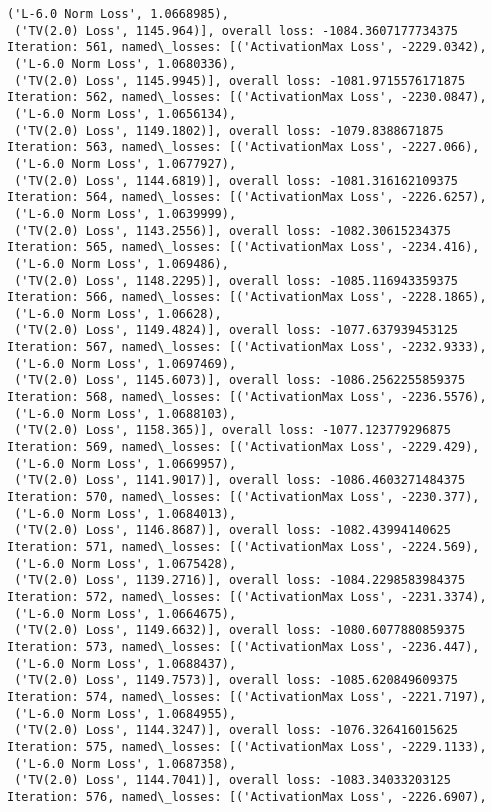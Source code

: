 \documentclass[10pt]{article}
\begin{document}
\begin{Verbatim}[commandchars=\\\{\}]
 ('L-6.0 Norm Loss', 1.0668985),
 ('TV(2.0) Loss', 1145.964)], overall loss: -1084.3607177734375
Iteration: 561, named\_losses: [('ActivationMax Loss', -2229.0342),
 ('L-6.0 Norm Loss', 1.0680336),
 ('TV(2.0) Loss', 1145.9945)], overall loss: -1081.9715576171875
Iteration: 562, named\_losses: [('ActivationMax Loss', -2230.0847),
 ('L-6.0 Norm Loss', 1.0656134),
 ('TV(2.0) Loss', 1149.1802)], overall loss: -1079.8388671875
Iteration: 563, named\_losses: [('ActivationMax Loss', -2227.066),
 ('L-6.0 Norm Loss', 1.0677927),
 ('TV(2.0) Loss', 1144.6819)], overall loss: -1081.316162109375
Iteration: 564, named\_losses: [('ActivationMax Loss', -2226.6257),
 ('L-6.0 Norm Loss', 1.0639999),
 ('TV(2.0) Loss', 1143.2556)], overall loss: -1082.30615234375
Iteration: 565, named\_losses: [('ActivationMax Loss', -2234.416),
 ('L-6.0 Norm Loss', 1.069486),
 ('TV(2.0) Loss', 1148.2295)], overall loss: -1085.116943359375
Iteration: 566, named\_losses: [('ActivationMax Loss', -2228.1865),
 ('L-6.0 Norm Loss', 1.06628),
 ('TV(2.0) Loss', 1149.4824)], overall loss: -1077.637939453125
Iteration: 567, named\_losses: [('ActivationMax Loss', -2232.9333),
 ('L-6.0 Norm Loss', 1.0697469),
 ('TV(2.0) Loss', 1145.6073)], overall loss: -1086.2562255859375
Iteration: 568, named\_losses: [('ActivationMax Loss', -2236.5576),
 ('L-6.0 Norm Loss', 1.0688103),
 ('TV(2.0) Loss', 1158.365)], overall loss: -1077.123779296875
Iteration: 569, named\_losses: [('ActivationMax Loss', -2229.429),
 ('L-6.0 Norm Loss', 1.0669957),
 ('TV(2.0) Loss', 1141.9017)], overall loss: -1086.4603271484375
Iteration: 570, named\_losses: [('ActivationMax Loss', -2230.377),
 ('L-6.0 Norm Loss', 1.0684013),
 ('TV(2.0) Loss', 1146.8687)], overall loss: -1082.43994140625
Iteration: 571, named\_losses: [('ActivationMax Loss', -2224.569),
 ('L-6.0 Norm Loss', 1.0675428),
 ('TV(2.0) Loss', 1139.2716)], overall loss: -1084.2298583984375
Iteration: 572, named\_losses: [('ActivationMax Loss', -2231.3374),
 ('L-6.0 Norm Loss', 1.0664675),
 ('TV(2.0) Loss', 1149.6632)], overall loss: -1080.6077880859375
Iteration: 573, named\_losses: [('ActivationMax Loss', -2236.447),
 ('L-6.0 Norm Loss', 1.0688437),
 ('TV(2.0) Loss', 1149.7573)], overall loss: -1085.620849609375
Iteration: 574, named\_losses: [('ActivationMax Loss', -2221.7197),
 ('L-6.0 Norm Loss', 1.0684955),
 ('TV(2.0) Loss', 1144.3247)], overall loss: -1076.326416015625
Iteration: 575, named\_losses: [('ActivationMax Loss', -2229.1133),
 ('L-6.0 Norm Loss', 1.0687358),
 ('TV(2.0) Loss', 1144.7041)], overall loss: -1083.34033203125
Iteration: 576, named\_losses: [('ActivationMax Loss', -2226.6907),

\end{Verbatim}
\end{document}
